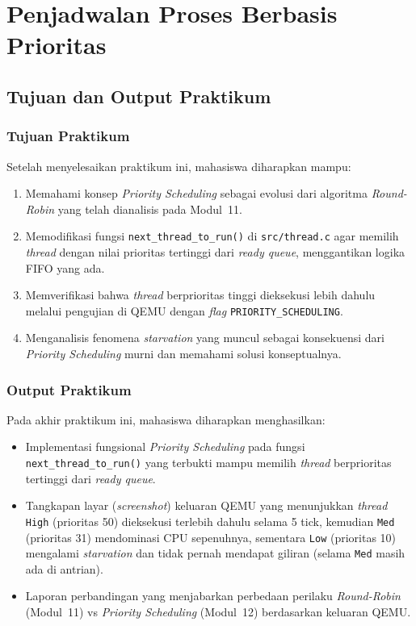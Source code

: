 
\chapter{Penjadwalan Proses Berbasis Prioritas}
\label{chap:modul-12}

\section{Tujuan dan Output Praktikum}

\subsection{Tujuan Praktikum}
Setelah menyelesaikan praktikum ini, mahasiswa diharapkan mampu:
\begin{enumerate}
	\item Memahami konsep \textit{Priority Scheduling} sebagai evolusi dari algoritma \textit{Round-Robin} yang telah dianalisis pada Modul~11.
	\item Memodifikasi fungsi \texttt{next\_thread\_to\_run()} di \texttt{src/thread.c} agar memilih \textit{thread} dengan nilai prioritas tertinggi dari \textit{ready queue}, menggantikan logika FIFO yang ada.
	\item Memverifikasi bahwa \textit{thread} berprioritas tinggi dieksekusi lebih dahulu melalui pengujian di QEMU dengan \textit{flag} \texttt{PRIORITY\_SCHEDULING}.
	\item Menganalisis fenomena \textit{starvation} yang muncul sebagai konsekuensi dari \textit{Priority Scheduling} murni dan memahami solusi konseptualnya.
\end{enumerate}

\subsection{Output Praktikum}
Pada akhir praktikum ini, mahasiswa diharapkan menghasilkan:
\begin{itemize}
	\item Implementasi fungsional \textit{Priority Scheduling} pada fungsi \texttt{next\_thread\_to\_run()} yang terbukti mampu memilih \textit{thread} berprioritas tertinggi dari \textit{ready queue}.
	\item Tangkapan layar (\textit{screenshot}) keluaran QEMU yang menunjukkan \textit{thread} \texttt{High} (prioritas 50) dieksekusi terlebih dahulu selama 5 tick, kemudian \texttt{Med} (prioritas 31) mendominasi CPU sepenuhnya, sementara \texttt{Low} (prioritas 10) mengalami \textit{starvation} dan tidak pernah mendapat giliran (selama \texttt{Med} masih ada di antrian).
	\item Laporan perbandingan yang menjabarkan perbedaan perilaku \textit{Round-Robin} (Modul~11) vs \textit{Priority Scheduling} (Modul~12) berdasarkan keluaran QEMU.
\end{itemize}

